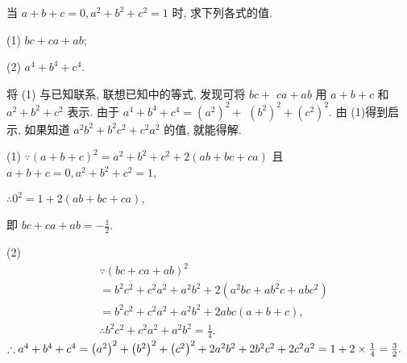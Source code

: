 \begin{example}
	当 $a+b+c=0, a^2+b^2+c^2=1$ 时, 求下列各式的值.

	(1) $b c+c a+a b$;

	(2) $a^4+b^4+c^4$.
\end{example}
\begin{analysis}
	将 (1) 与已知联系, 联想已知中的等式, 发现可将 $b c+$ $c a+a b$ 用 $a+b+c$ 和 $a^2+b^2+c^2$ 表示. 由于 $a^4+b^4+c^4=\left(a^2\right)^2+$ $\left(b^2\right)^2+\left(c^2\right)^2$. 由 (1)得到启示, 如果知道 $a^2 b^2+b^2 c^2+c^2 a^2$ 的值, 就能得解.
\end{analysis}
\begin{solution}
	(1) $\because(a+b+c)^2=a^2+b^2+c^2+2(a b+b c+c a)$
	且 $a+b+c=0, a^2+b^2+c^2=1$,

	$\therefore 0^2=1+2(a b+b c+c a),$

	即 $b c+c a+a b=-\frac{1}{2}$.

	(2)	\begin{align}
		 & \because(b c+c a+a b)^2                                        \\
		 & =b^2 c^2+c^2 a^2+a^2 b^2+2\left(a^2 b c+a b^2 c+a b c^2\right) \\
		 & =b^2 c^2+c^2 a^2+a^2 b^2+2 a b c(a+b+c),                       \\
		 & \therefore b^2 c^2+c^2 a^2+a^2 b^2=\frac{1}{4} .
	\end{align}
	$ \therefore a^4+b^4+c^4=\left(a^2\right)^2+\left(b^2\right)^2+\left(c^2\right)^2+2 a^2 b^2+2 b^2 c^2+2 c^2 a^2 \\
		=1+2 \times \frac{1}{4}=\frac{3}{2} .$
\end{solution}

